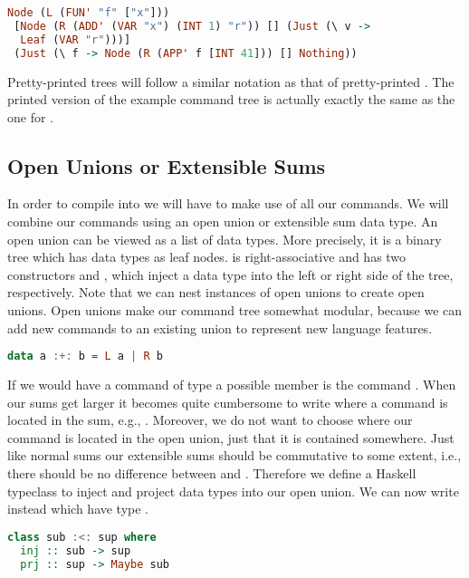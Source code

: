 \begin{lstlisting}[language=Haskell]
Node (L (FUN' "f" ["x"]))
 [Node (R (ADD' (VAR "x") (INT 1) "r")) [] (Just (\ v ->
  Leaf (VAR "r")))]
 (Just (\ f -> Node (R (APP' f [INT 41])) [] Nothing))
\end{lstlisting}

Pretty-printed trees will follow a similar notation as that of pretty-printed . The printed version of the example command tree is actually exactly the same as the one for .

\subsection{\label{subsection:openunion}Open Unions or Extensible Sums}
In order to compile  into  we will have to make use of all our commands. We will combine our commands using an open union or extensible sum data type. An open union can be viewed as a list of data types. More precisely, it is a binary tree which has data types as leaf nodes. \icode{:+:} is right-associative and has two constructors  and , which inject a data type into the left or right side of the tree, respectively. Note that we can nest instances of open unions to create open unions. Open unions make our command tree somewhat modular, because we can add new commands to an existing union to represent new language features.

\begin{lstlisting}[language=Haskell]
data a :+: b = L a | R b
\end{lstlisting}

If we would have a command of type  a possible member is the command . When our sums get larger it becomes quite cumbersome to write where a command is located in the sum, e.g., . Moreover, we do not want to choose where our command is located in the open union, just that it is contained somewhere. Just like normal sums our extensible sums should be commutative to some extent, i.e., there should be no difference between  and . Therefore we define a Haskell typeclass to inject and project data types into our open union. We can now write  instead which have type .

\begin{lstlisting}[language=Haskell]
class sub :<: sup where
  inj :: sub -> sup
  prj :: sup -> Maybe sub
\end{lstlisting}

